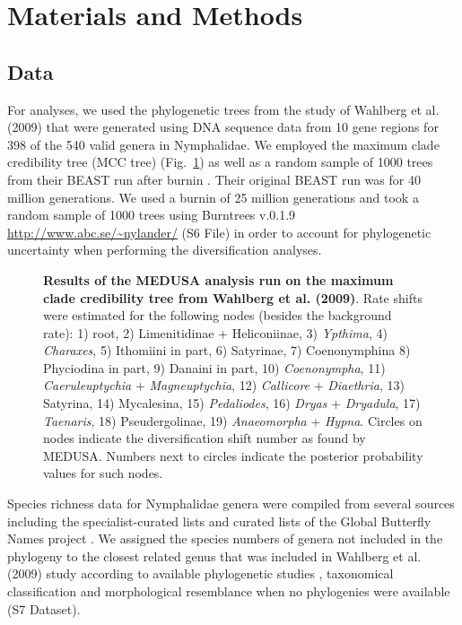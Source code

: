 \documentclass[10pt,letterpaper]{article}
\begin{document}
\section*{Materials and Methods}
\subsection*{Data}

For analyses, we used the phylogenetic trees from the study of Wahlberg
et al. (2009) \cite{wahlberg2009} that were generated using DNA sequence data from
10 gene regions for 398 of the 540 valid genera in Nymphalidae. We
employed the maximum clade credibility tree (MCC tree) (Fig.~\ref{fig1}) as well
as a random sample of 1000 trees from their BEAST run after burnin
\cite{wahlberg2009}. Their original BEAST run was for 40 million generations. We
used a burnin of 25 million generations and took a random sample of 1000
trees using Burntrees v.0.1.9 \url{http://www.abc.se/~nylander/} (S6 File)
in order to account for phylogenetic uncertainty when performing
the diversification analyses.

\begin{figure}[h]
\caption{{\bf Results of the MEDUSA analysis run on the maximum
clade credibility tree from Wahlberg et al. (2009)}. Rate shifts were estimated for the
following nodes (besides the background rate): 1) root, 2) Limenitidinae +
Heliconiinae, 3) \emph{Ypthima}, 4) \emph{Charaxes}, 5) Ithomiini in
part, 6) Satyrinae, 7) Coenonymphina 8) Phyciodina in part, 9) Danaini in
part, 10) \emph{Coenonympha}, 11) \emph{Caeruleuptychia} +
\emph{Magneuptychia}, 12) \emph{Callicore} + \emph{Diaethria}, 13)
Satyrina, 14) Mycalesina, 15) \emph{Pedaliodes}, 16) \emph{Dryas} +
\emph{Dryadula}, 17) \emph{Taenaris}, 18) Pseudergolinae, 19)
\emph{Anaeomorpha} + \emph{Hypna}. Circles on
nodes indicate the diversification shift number as found by MEDUSA.
Numbers next to circles indicate the posterior probability values for
such nodes.}
\label{fig1}
\end{figure}

Species richness data for Nymphalidae genera were compiled from several
sources including the specialist-curated lists 
\cite{tolweb2007, lamas2004} and curated lists of the
Global Butterfly Names project \cite{gbnp}.
We assigned the species numbers of genera not included in the phylogeny
to the closest related genus that was included in Wahlberg et al. (2009)
\cite{wahlberg2009} study according to available phylogenetic studies 
\cite{matos2013, brower2010, kodandaramaiah2010, kodandaramaiah2010a,
ortiz2013, desilva2010, freitas2004, pena2006, penz1999, silva2008,
pena2011, pena2010},
taxonomical classification and morphological resemblance when no
phylogenies were available (S7 Dataset).
\end{document}
